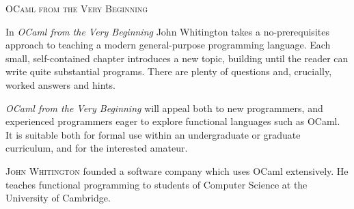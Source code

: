\documentclass[]{book}
\begin{document}
\frontmatter

%
%
%
%


%




\thispagestyle{empty}

{\Large\scshape OCaml from the Very Beginning}

\vspace{16mm}

\setlength{\parindent}{25pt}
\noindent In \textit{OCaml from the Very Beginning} John Whitington takes a no-prerequisites approach to teaching a modern general-purpose programming language. Each small, self-contained chapter introduces a new topic, building until the reader can write quite substantial programs. There are plenty of questions and, crucially, worked answers and hints.

\textit{OCaml from the Very Beginning} will appeal both to new programmers, and experienced programmers eager to explore functional languages such as OCaml. It is suitable both for formal use within an undergraduate or graduate curriculum, and for the interested amateur.

\vspace{8mm}

\noindent\textsc{John Whitington} founded a software company which uses OCaml extensively. He teaches functional programming to students of Computer Science at the University of Cambridge.
\end{document}
